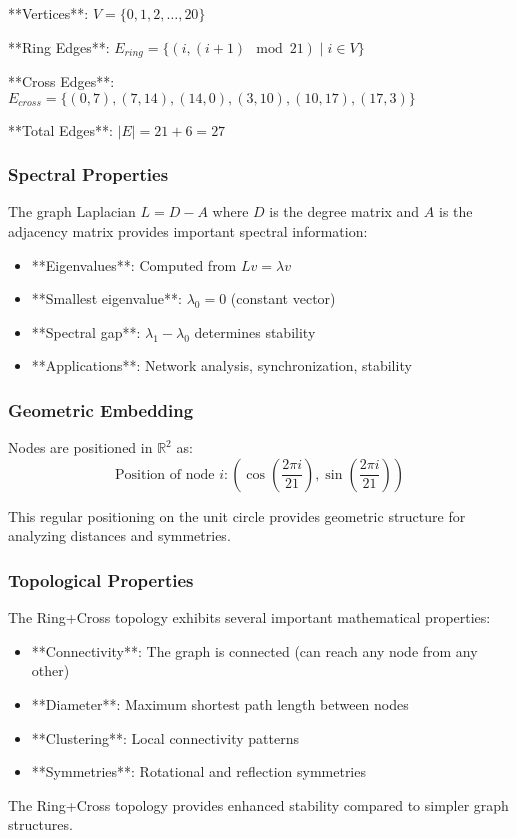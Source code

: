\documentclass[12pt,a4paper]{article}
\begin{document}
**Vertices**: $V = \{0, 1, 2, \dots, 20\}$

**Ring Edges**: $E_{ring} = \{(i, (i+1) \mod 21) \mid i \in V\}$

**Cross Edges**: $E_{cross} = \{(0,7), (7,14), (14,0), (3,10), (10,17), (17,3)\}$

**Total Edges**: $|E| = 21 + 6 = 27$

\subsubsection{Spectral Properties}
The graph Laplacian $L = D - A$ where $D$ is the degree matrix and $A$ is the adjacency matrix provides important spectral information:

\begin{itemize}
\item **Eigenvalues**: Computed from $L v = \lambda v$
\item **Smallest eigenvalue**: $\lambda_0 = 0$ (constant vector)
\item **Spectral gap**: $\lambda_1 - \lambda_0$ determines stability
\item **Applications**: Network analysis, synchronization, stability
\end{itemize}

\subsubsection{Geometric Embedding}
Nodes are positioned in $\mathbb{R}^2$ as:
\begin{equation}
\text{Position of node } i: \left( \cos\left(\frac{2\pi i}{21}\right), \sin\left(\frac{2\pi i}{21}\right) \right)
\end{equation}

This regular positioning on the unit circle provides geometric structure for analyzing distances and symmetries.

\subsubsection{Topological Properties}
The Ring+Cross topology exhibits several important mathematical properties:

\begin{itemize}
\item **Connectivity**: The graph is connected (can reach any node from any other)
\item **Diameter**: Maximum shortest path length between nodes
\item **Clustering**: Local connectivity patterns
\item **Symmetries**: Rotational and reflection symmetries
\end{itemize}
The Ring+Cross topology provides enhanced stability compared to simpler graph structures.
\end{document}
